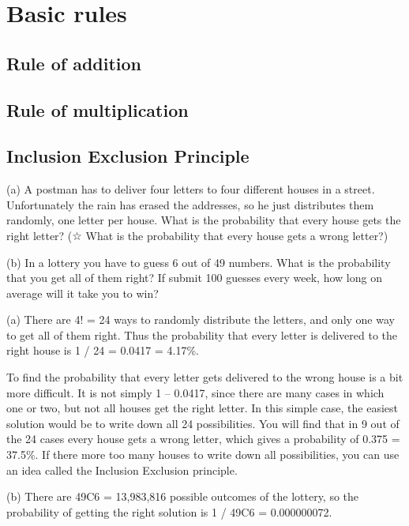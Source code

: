\section{Basic rules}
\label{sec:basic-rule-of-combinatorics}

\subsection{Rule of addition}
\label{sec:rule-of-addition}

\subsection{Rule of multiplication}
\label{sec:rule-of-multiplication}

\subsection{Inclusion Exclusion Principle}
\label{sec:inclusion-exclusion-principle}

(a) A postman has to deliver four letters to four different houses in a street. Unfortunately the rain has erased the
addresses, so he just distributes them randomly, one letter per house. What is the probability that every house gets
the right letter? (☆ What is the probability that every house gets a wrong letter?)

(b) In a lottery you have to guess 6 out of 49 numbers. What is the probability that you get all of them right? If
submit 100 guesses every week, how long on average will it take you to win?

(a) There are 4! = 24 ways to randomly distribute the letters, and only one way to get all of them right. Thus the
probability that every letter is delivered to the right house is 1 / 24 = 0.0417 = 4.17\%.

To find the probability that every letter gets delivered to the wrong house is a bit more difficult. It is not simply
1 – 0.0417, since there are many cases in which one or two, but not all houses get the right letter. In this simple
case, the easiest solution would be to write down all 24 possibilities. You will find that in 9 out of the 24 cases
every house gets a wrong letter, which gives a probability of 0.375 = 37.5\%. If there more too many houses to write
down all possibilities, you can use an idea called the Inclusion Exclusion principle.

(b) There are 49C6 = 13,983,816 possible outcomes of the lottery, so the probability of getting the right solution is
1 / 49C6 = 0.000000072.

